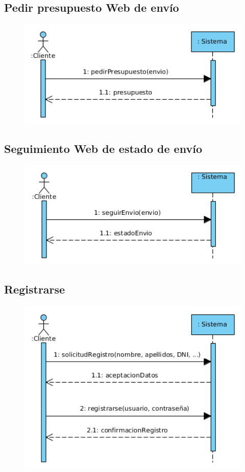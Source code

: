 \subsection{Pedir presupuesto Web de envío}
\begin{figure}[H]
	\centering
	\includegraphics[width=16cm]{51}
\end{figure}
\subsection{Seguimiento Web de estado de envío}
\begin{figure}[H]
	\centering
	\includegraphics[width=16cm]{52}
\end{figure}
\subsection{Registrarse}
\begin{figure}[H]
	\centering
	\includegraphics[width=16cm]{53}
\end{figure}
